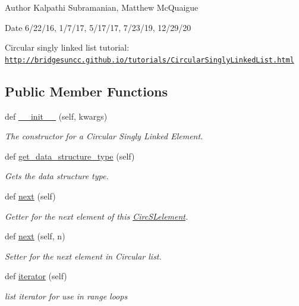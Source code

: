 \begin{DoxyAuthor}{Author}
Kalpathi Subramanian, Matthew Mc\+Quaigue
\end{DoxyAuthor}
\begin{DoxyDate}{Date}
6/22/16, 1/7/17, 5/17/17, 7/23/19, 12/29/20
\end{DoxyDate}
Circular singly linked list tutorial\+: \href{http://bridgesuncc.github.io/tutorials/CircularSinglyLinkedList.html}{\tt http\+://bridgesuncc.\+github.\+io/tutorials/\+Circular\+Singly\+Linked\+List.\+html} \subsection*{Public Member Functions}
\begin{DoxyCompactItemize}
\item 
def \hyperlink{classbridges_1_1circ__sl__element_1_1_circ_s_lelement_a8ffff39d70e7e94d8d8573e555a6ff35}{\+\_\+\+\_\+init\+\_\+\+\_\+} (self, kwargs)
\begin{DoxyCompactList}\small\item\em The constructor for a Circular Singly Linked Element. \end{DoxyCompactList}\item 
def \hyperlink{classbridges_1_1circ__sl__element_1_1_circ_s_lelement_a82b1dbb8592c943eb68161ee60ac3492}{get\+\_\+data\+\_\+structure\+\_\+type} (self)
\begin{DoxyCompactList}\small\item\em Gets the data structure type. \end{DoxyCompactList}\item 
def \hyperlink{classbridges_1_1circ__sl__element_1_1_circ_s_lelement_a5abc123aa4a20414a02785f3b1cc342a}{next} (self)
\begin{DoxyCompactList}\small\item\em Getter for the next element of this \hyperlink{classbridges_1_1circ__sl__element_1_1_circ_s_lelement}{Circ\+S\+Lelement}. \end{DoxyCompactList}\item 
def \hyperlink{classbridges_1_1circ__sl__element_1_1_circ_s_lelement_a0215303874e167e22f92e4adbdee1e84}{next} (self, n)
\begin{DoxyCompactList}\small\item\em Setter for the next element in Circular list. \end{DoxyCompactList}\item 
def \hyperlink{classbridges_1_1circ__sl__element_1_1_circ_s_lelement_a8c95461772d1f997afa11e2cabc3fd21}{iterator} (self)
\begin{DoxyCompactList}\small\item\em list iterator for use in range loops \end{DoxyCompactList}\end{DoxyCompactItemize}

